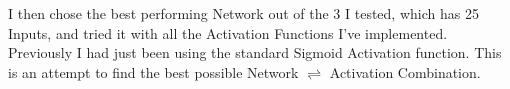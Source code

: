 \begin{flushleft}
        \begin{figure}[H]
            \centering
            \qquad
        \end{figure}

        I then chose the best performing Network out of the 3 I tested, which has 25 Inputs, and tried it with all the Activation Functions I've implemented. Previously
        I had just been using the standard Sigmoid Activation function. This is an attempt to find the best possible Network $\rightleftharpoons$ Activation Combination.


\end{flushleft}
